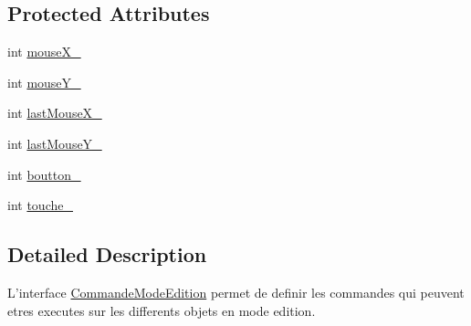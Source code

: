 \subsection*{Protected Attributes}
\begin{DoxyCompactItemize}
\item 
int \hyperlink{class_commande_mode_edition_ade7653be98ae5dd9da895a34983ec680}{mouse\-X\-\_\-}
\item 
int \hyperlink{class_commande_mode_edition_a6128370123ce4b6e6fb8571c953241e4}{mouse\-Y\-\_\-}
\item 
int \hyperlink{class_commande_mode_edition_a02fd21f564101674d5c8af535322ea02}{last\-Mouse\-X\-\_\-}
\item 
int \hyperlink{class_commande_mode_edition_a42bd29db98adec623e8c7cd5771783f3}{last\-Mouse\-Y\-\_\-}
\item 
int \hyperlink{class_commande_mode_edition_a84e2d980201bc0649b2af9c9f4bff7e6}{boutton\-\_\-}
\item 
int \hyperlink{class_commande_mode_edition_a3a522c03034a54eb01178e8c8af9a8db}{touche\-\_\-}
\end{DoxyCompactItemize}


\subsection{Detailed Description}
L'interface \hyperlink{class_commande_mode_edition}{Commande\-Mode\-Edition} permet de definir les commandes qui peuvent etres executes sur les differents objets en mode edition. 

